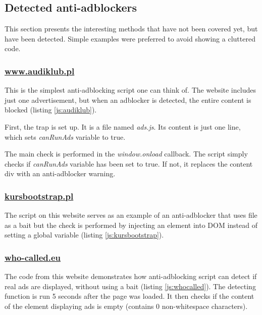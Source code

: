 \subsection{Detected anti-adblockers}

This section presents the interesting methods that have not been covered yet, but have been detected.
Simple examples were preferred to avoid showing a cluttered code.

\subsubsection{\url{www.audiklub.pl}}
\label{audiklub}
This is the simplest anti-adblocking script one can think of. The website includes just one advertisement, 
but when an adblocker is detected, the entire content is blocked (listing \ref{js:audiklub}).



First, the trap is set up. It is a file named \emph{ads.js}.
Its content is just one line, which sets \emph{canRunAds} variable to true.

The main check is performed in the \emph{window.onload} callback. The script simply checks
if \emph{canRunAds} variable has been set to true. If not, it replaces the content div with an anti-adblocker warning.

\subsubsection{\url{kursbootstrap.pl}}
The script on this website serves as an example of an anti-adblocker that uses file as a bait
but the check is performed by injecting an element into DOM instead of setting a global variable
(listing \ref{js:kursbootstrap}).


                       
\subsubsection{\url{who-called.eu}}
The code from this website demonstrates how anti-adblocking script can detect if real
ads are displayed, without using a bait (listing \ref{js:whocalled}).
The detecting function is run 5 seconds after the page was loaded. It then checks if the content 
of the element displaying ads is empty (contains 0 non-whitespace characters).

